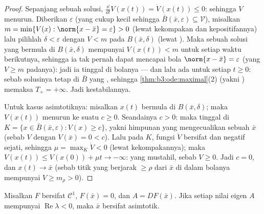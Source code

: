 \begin{proof}
Sepanjang sebuah solusi, $\frac{\dd}{\dd t}V(x(t)) = \dot V(x(t))
\leq 0$: sehingga $V$ menurun. Diberikan $\varepsilon$ (yang cukup kecil
sehingga $\bar B(\bar x, \varepsilon) \subseteq \mathcal V$), misalkan
$m = \min\{V(x) : \norm{x - \bar x} = \varepsilon\} > 0$
(lewat kekompakan dan kepositifannya) lalu pilihlah $\delta < \varepsilon$
dengan $V < m$ pada $B(\bar x, \delta)$ (lewat ). Maka sebuah solusi
yang bermula di $B(\bar x, \delta)$ mempunyai $V(x(t)) < m$ untuk setiap
waktu berikutnya, sehingga ia tak pernah dapat mencapai bola $\norm{x -
\bar x} = \varepsilon$ (yang $V \geq m$ padanya): jadi ia tinggal di
bolanya --- dan lalu ada untuk setiap $t \geq 0$: sebab solusinya
tetap di $\bar B$ yang , sehingga
\cref{thm:b3:ode:maximal}(2) (yakni ) memaksa
$T_+ = +\infty$. Jadi kestabilannya.

Untuk kasus asimtotiknya: misalkan $x(t)$ bermula di $B(\bar x, \delta)$;
maka $V(x(t))$ menurun ke suatu $c \geq 0$. Seandainya $c > 0$: maka
 tinggal di $K = \{x \in \bar B(\bar x,
\varepsilon): V(x) \geq c\}$, yakni himpunan  yang mengecualikan sebuah
 $\bar x$ (sebab $V$  dengan $V(\bar x)
= 0 < c$). Lalu pada $K$, fungsi $\dot V$ bersifat  dan
negatif sejati, sehingga $\mu = \max_K\dot V < 0$
(lewat kekompakannya); maka $V(x(t)) \leq V(x(0)) + \mu t \to
-\infty$: yang mustahil, sebab $V \geq 0$. Jadi
$c = 0$, dan $x(t) \to \bar x$ (sebab titik yang berjarak $\geq
\rho$ dari $\bar x$ di dalam bolanya mempunyai $V \geq m_\rho >
0$).
\end{proof}

\begin{theorem}
\label{thm:b3:ode:linearization}
Misalkan $F$ bersifat $\mathcal C^1$, $F(\bar x) = 0$, dan $A = DF(\bar x)$.
Jika setiap nilai eigen $A$ mempunyai $\operatorname{Re}\lambda <
0$, maka $\bar x$ bersifat  asimtotik.
\end{theorem}

